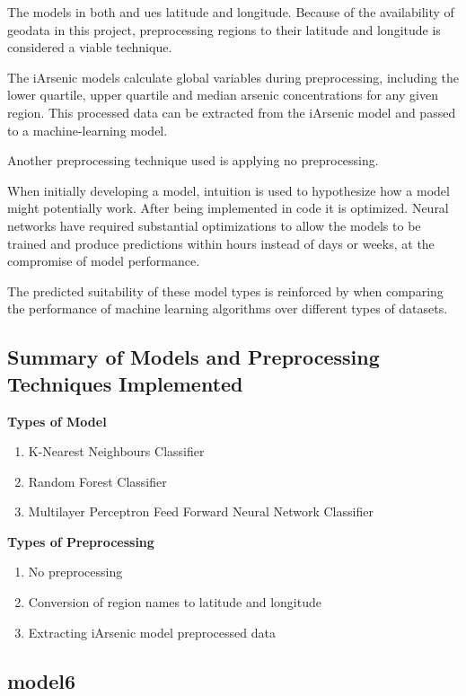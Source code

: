 The models in both \cite{Winkel2008} and \cite{Connolly2022} ues latitude and longitude. Because of the availability of geodata in this project, preprocessing regions to their latitude and longitude is considered a viable technique. 

The iArsenic models calculate global variables during preprocessing, including the lower quartile, upper quartile and median arsenic concentrations for any given region. This processed data can be extracted from the iArsenic model and passed to a machine-learning model.

Another preprocessing technique used is applying no preprocessing.

When initially developing a model, intuition is used to hypothesize how a model might potentially work. After being implemented in code it is optimized. Neural networks have required substantial optimizations to allow the models to be trained and produce predictions within hours instead of days or weeks, at the compromise of model performance.

The predicted suitability of these model types is reinforced by \cite{Caruana2006} when comparing the performance of machine learning algorithms over different types of datasets.

\subsection{Summary of Models and Preprocessing Techniques Implemented}

\textbf{Types of Model}

\begin{enumerate}
    \item K-Nearest Neighbours Classifier
    \item Random Forest Classifier
    \item Multilayer Perceptron Feed Forward Neural Network Classifier
\end{enumerate}

\textbf{Types of Preprocessing}

\begin{enumerate}
    \item No preprocessing
    \item Conversion of region names to latitude and longitude
    \item Extracting iArsenic model preprocessed data
\end{enumerate}

\subsection{model6}

